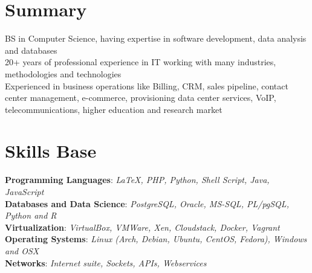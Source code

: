 \documentclass[margin]{res}
\begin{document}
\fontsize{9}{12}
\selectfont
\address{\textbf{ANDRE LEITE REIS} \\
         London, UK \\
         andre.reis@gmail.com \\
         +44 074 8210 1626 \\
         linkedin.com/in/andreleitereis \\
         github.com/reis \\
         twitter.com/mrkings }

\begin{resume}
\section{Summary}
    BS in Computer Science, having expertise in software development, data analysis and databases \\
    20+ years of professional experience in IT working with many industries, methodologies and technologies \\
    Experienced in business operations like Billing, CRM, sales pipeline, contact center management, e-commerce, provisioning data center services, VoIP, telecommunications, higher education and research market \\

\section{Skills Base}
    \textbf{Programming Languages}: \textit{\LaTeX, PHP, Python, Shell Script, Java, JavaScript} \\
    \textbf{Databases and Data Science}: \textit{PostgreSQL, Oracle, MS-SQL, PL/pgSQL, Python and R} \\
    \textbf{Virtualization}: \textit{VirtualBox, VMWare, Xen, Cloudstack, Docker, Vagrant} \\
    \textbf{Operating Systems}: \textit{Linux (Arch, Debian, Ubuntu, CentOS, Fedora), Windows and OSX} \\
    \textbf{Networks}: \textit{Internet suite, Sockets, APIs, Webservices} \\


\end{resume}
\end{document}
